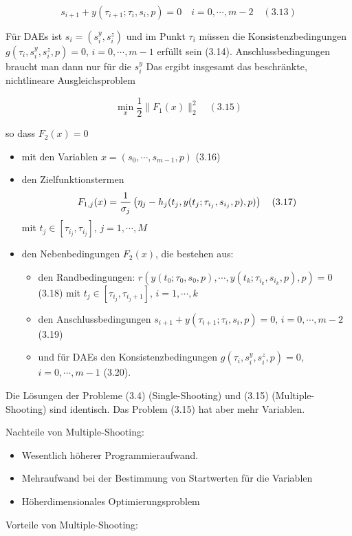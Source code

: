 \[ s_{i+1} + y(\tau_{i+1}; \tau_i, s_i, p) = 0 \quad i=0,\cdots,m-2 \quad (3.13)\]

Für DAEs ist $s_i = (s_i^y, s_i^z)$ und im Punkt $\tau_i$ müssen die Konsistenzbedingungen $g(\tau_i, s_i^y, s_i^z, p) = 0$, $i=0,\cdots,m-1$ erfüllt sein (3.14). Anschlussbedingungen braucht man dann nur für die $s_i^y$ Das ergibt insgesamt das beschränkte, nichtlineare Ausgleichsproblem

\[ \min_x \frac  12 \|F_1(x)\|_2^2 \quad (3.15) \]

so dass $F_2(x) = 0$

\begin{itemize}
\item mit den Variablen $x = (s_0,\cdots,s_{m-1}, p)$ (3.16)
\item den Zielfunktionstermen
\[ F_{1,j} (x) = \frac 1{\sigma_j} \left( \eta_j - h_j(t_j,y(t_j; \tau_{i_j}, s_{i_j}, p), p) \right)  \quad (3.17) \]
mit $t_j \in [\tau_{i_j}, \tau_{i_j}]$, $j=1,\cdots,M$
\item den Nebenbedingungen $F_2(x)$, die bestehen aus:
\begin{itemize}
\item den Randbedingungen: $r(y(t_0;\tau_0,s_0,p),\cdots,y(t_k;\tau_{i_k},s_{i_k},p), p) = 0 $ (3.18) mit $t_j \in [\tau_{i_j},\tau_{i_j + 1}]$, $i=1,\cdots,k$
\item den Anschlussbedingungen $s_{i+1}+y(\tau_{i+1};\tau_i,s_i,p)=0$, $i=0,\cdots,m-2$ (3.19)
\item und für DAEs den Konsistenzbedingungen  $g(\tau_i, s_i^y, s_i^z,p)=0$, $i=0,\cdots,m-1$ (3.20).
\end{itemize}
\end{itemize}

Die Lösungen der Probleme (3.4) (Single-Shooting) und (3.15) (Multiple-Shooting) sind identisch. Das Problem (3.15) hat aber mehr Variablen.

Nachteile von Multiple-Shooting:

\begin{itemize}
\item Wesentlich höherer Programmieraufwand.
\item Mehraufwand bei der Bestimmung von Startwerten für die Variablen
\item Höherdimensionales Optimierungsproblem
\end{itemize}

Vorteile von Multiple-Shooting:


